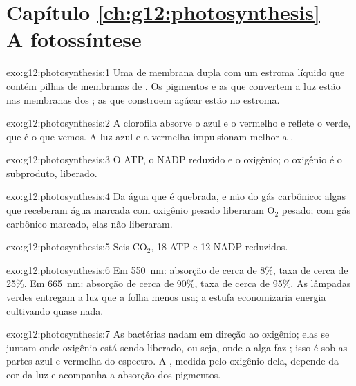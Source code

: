 \section*{Capítulo \ref{ch:g12:photosynthesis} --- A fotossíntese}

\begin{solution}{exo:g12:photosynthesis:1}
Uma  de membrana dupla com um estroma líquido que contém pilhas
de membranas de . Os pigmentos e as  que convertem a
luz estão nas membranas dos ; as  que constroem
açúcar estão no estroma.
\end{solution}

\begin{solution}{exo:g12:photosynthesis:2}
A clorofila absorve o azul e o vermelho e reflete o verde, que é o que
vemos. A luz azul e a vermelha impulsionam melhor a .
\end{solution}

\begin{solution}{exo:g12:photosynthesis:3}
O ATP, o NADP reduzido e o oxigênio; o oxigênio é o subproduto, liberado.
\end{solution}

\begin{solution}{exo:g12:photosynthesis:4}
Da água que é quebrada, e não do gás carbônico: algas que receberam
água marcada com oxigênio pesado liberaram $\mathrm{O_2}$ pesado; com
gás carbônico marcado, elas não liberaram.
\end{solution}

\begin{solution}{exo:g12:photosynthesis:5}
Seis $\mathrm{CO_2}$, 18 ATP e 12 NADP reduzidos.
\end{solution}

\begin{solution}{exo:g12:photosynthesis:6}
Em \qty{550}{nm}: absorção de cerca de 8\%, taxa de cerca de 25\%. Em
\qty{665}{nm}: absorção de cerca de 90\%, taxa de cerca de 95\%. As
lâmpadas verdes entregam a luz que a folha menos usa; a estufa
economizaria energia cultivando quase nada.
\end{solution}

\begin{solution}{exo:g12:photosynthesis:7}
As bactérias nadam em direção ao oxigênio; elas se juntam onde oxigênio
está sendo liberado, ou seja, onde a alga faz ; isso é sob
as partes azul e vermelha do espectro. A , medida pelo
oxigênio dela, depende da cor da luz e acompanha a absorção dos pigmentos.
\end{solution}

